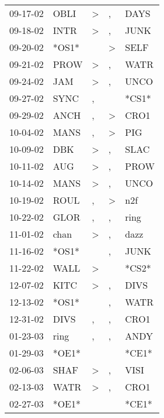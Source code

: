 \begin{supertabular}{lllll}
 09-17-02 &   OBLI &     \textgreater &             , &   DAYS \\
 09-18-02 &   INTR &     \textgreater &             , &   JUNK \\
 09-20-02 &  *OS1* &                  &  \textgreater &   SELF \\
 09-21-02 &   PROW &     \textgreater &             , &   WATR \\
 09-24-02 &    JAM &     \textgreater &             , &   UNCO \\
 09-27-02 &   SYNC &                , &               &  *CS1* \\
 09-29-02 &   ANCH &                , &  \textgreater &   CRO1 \\
 10-04-02 &   MANS &                , &  \textgreater &    PIG \\
 10-09-02 &    DBK &     \textgreater &             , &   SLAC \\
 10-11-02 &    AUG &     \textgreater &             , &   PROW \\
 10-14-02 &   MANS &     \textgreater &             , &   UNCO \\
 10-19-02 &   ROUL &                , &  \textgreater &    n2f \\
 10-22-02 &   GLOR &                , &             , &   ring \\
 11-01-02 &   chan &     \textgreater &             , &   dazz \\
 11-16-02 &  *OS1* &                  &             , &   JUNK \\
 11-22-02 &   WALL &     \textgreater &               &  *CS2* \\
 12-07-02 &   KITC &     \textgreater &             , &   DIVS \\
 12-13-02 &  *OS1* &                  &             , &   WATR \\
 12-31-02 &   DIVS &                , &             , &   CRO1 \\
 01-23-03 &   ring &                , &             , &   ANDY \\
 01-29-03 &  *OE1* &                  &               &  *CE1* \\
 02-06-03 &   SHAF &     \textgreater &             , &   VISI \\
 02-13-03 &   WATR &     \textgreater &             , &   CRO1 \\
 02-27-03 &  *OE1* &                  &               &  *CE1* \\

\end{supertabular}

